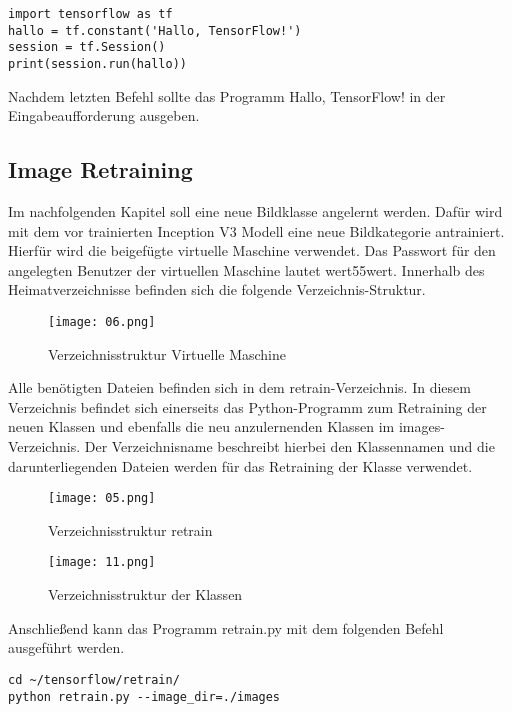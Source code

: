 \begin{lstlisting}[frame=single]
import tensorflow as tf
hallo = tf.constant('Hallo, TensorFlow!')
session = tf.Session()
print(session.run(hallo))
\end{lstlisting}

Nachdem letzten Befehl sollte das Programm \glqq{}Hallo, TensorFlow!\grqq{} in der Eingabeaufforderung ausgeben.

\subsection{Image Retraining}
\label{subsec:trans-erstellung}
Im nachfolgenden Kapitel soll eine neue Bildklasse angelernt werden. Dafür wird mit dem vor trainierten Inception V3 Modell eine neue Bildkategorie antrainiert. Hierfür wird die beigefügte virtuelle Maschine verwendet. Das Passwort für den angelegten Benutzer der virtuellen Maschine lautet \glqq{}wert55wert\grqq{}. Innerhalb des Heimatverzeichnisse befinden sich die folgende Verzeichnis-Struktur.

\begin{figure}[!h]
	\texttt{[image: 06.png]}
	\caption{Verzeichnisstruktur Virtuelle Maschine}
	\label{fig:06}
\end{figure}

Alle benötigten Dateien befinden sich in dem \glqq{}retrain\grqq{}-Verzeichnis. In diesem Verzeichnis befindet sich einerseits das Python-Programm zum Retraining der neuen Klassen und ebenfalls die neu anzulernenden Klassen im \glqq{}images\grqq{}-Verzeichnis. Der Verzeichnisname beschreibt hierbei den Klassennamen und die darunterliegenden Dateien werden für das Retraining der Klasse verwendet.

\begin{figure}[!h]
	\texttt{[image: 05.png]}
	\caption{Verzeichnisstruktur \glqq{}retrain\grqq{}}
	\label{fig:05}
\end{figure}

\begin{figure}[!h]
	\texttt{[image: 11.png]}
	\caption{Verzeichnisstruktur der Klassen}
	\label{fig:11}
\end{figure}

Anschließend kann das Programm \glqq{}retrain.py\grqq{} mit dem folgenden Befehl ausgeführt werden.

\begin{lstlisting}[frame=single]
cd ~/tensorflow/retrain/
python retrain.py --image_dir=./images
\end{lstlisting}


